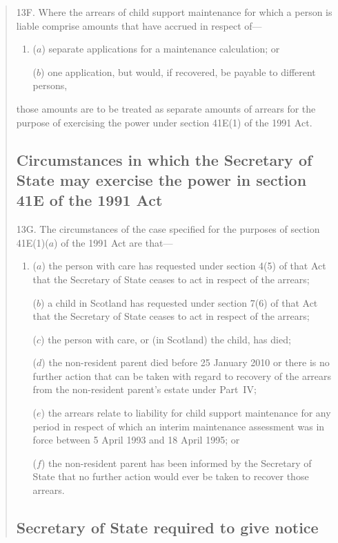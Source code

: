 \documentclass[12pt,a4paper]{article}
\begin{document}
\begin{quotation}
13F.  Where the arrears of child support maintenance for which a person is liable comprise amounts that have accrued in respect of—
\begin{enumerate}\item[]
($a$) separate applications for a maintenance calculation; or

($b$) one application, but would, if recovered, be payable to different persons,
\end{enumerate}
those amounts are to be treated as separate amounts of arrears for the purpose of exercising the power under section 41E(1) of the 1991 Act.

\subsection*{Circumstances in which the Secretary of State may exercise the power in section 41E of the 1991 Act}

13G.  The circumstances of the case specified for the purposes of section 41E(1)($a$)  of the 1991 Act are that—
\begin{enumerate}\item[]
($a$) the person with care has requested under section 4(5) of that Act that the Secretary of State ceases to act in respect of the arrears;

($b$) a child in Scotland has requested under section 7(6) of that Act that the Secretary of State ceases to act in respect of the arrears;

($c$) the person with care, or (in Scotland) the child, has died;

($d$) the non-resident parent died before 25 January 2010 or there is no further action that can be taken with regard to recovery of the arrears from the non-resident parent’s estate under Part~IV;

($e$) the arrears relate to liability for child support maintenance for any period in respect of which an interim maintenance assessment was in force between 5 April 1993 and 18 April 1995; or

($f$) the non-resident parent has been informed by the Secretary of State that no further action would ever be taken to recover those arrears.
\end{enumerate}

\subsection*{Secretary of State required to give notice}


\end{quotation}
\end{document}
